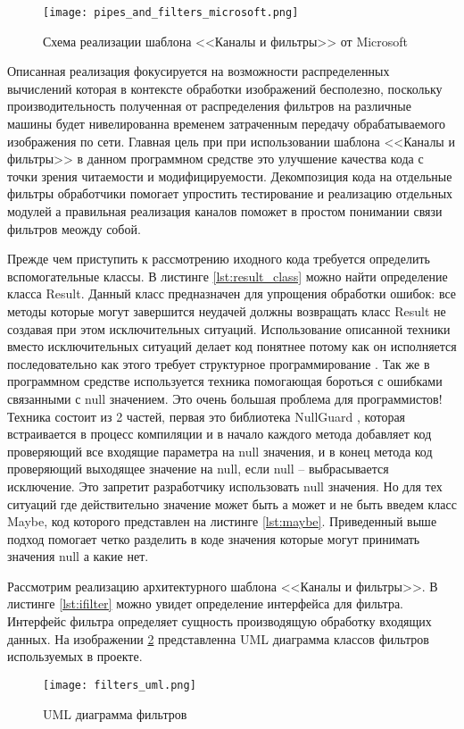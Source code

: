 \begin{figure}[ht] 
    \centering
    \texttt{[image: pipes\_and\_filters\_microsoft.png]}  
    \caption{Схема реализации шаблона <<Каналы и фильтры>> от Microsoft}
    \label{fig:creation:pipes_and_filters_microsoft}
\end{figure}

Описанная реализация фокусируется на возможности распределенных вычислений которая в контексте обработки изображений бесполезно, поскольку производительность полученная от распределения фильтров на различные машины будет нивелированна временем затраченным передачу обрабатываемого изображения по сети. Главная цель при при использовании шаблона <<Каналы и фильтры>> в данном программном средстве это улучшение качества кода с точки зрения читаемости и модифицируемости. Декомпозиция кода на отдельные фильтры обработчики помогает упростить тестирование и реализацию отдельных модулей а правильная реализация каналов поможет в простом понимании связи фильтров меожду собой.  

Прежде чем приступить к рассмотрению иходного кода требуется определить вспомогательные классы. 
В листинге \ref{lst:result_class} можно найти определение класса Result. Данный класс предназначен для упрощения обработки ошибок: все методы которые могут завершится неудачей должны возвращать класс Result не создавая при этом исключительных ситуаций. Использование описанной техники вместо исключительных ситуаций делает код понятнее потому как он исполняется последовательно как этого требует структурное программирование \cite{structured_programming}. Так же в программном средстве используется техника помогающая бороться с ошибками связанными с null значением. Это очень большая проблема для программистов! Техника состоит из 2 частей, первая это библиотека NullGuard \cite{null_guard}, которая встраивается в процесс компиляции и в начало каждого метода добавляет код проверяющий все входящие параметра на null значения, и в конец метода код проверяющий выходящее значение на null, если null -- выбрасывается исключение. Это запретит разработчику использовать null значения. Но для тех ситуаций где действительно значение может быть а может и не быть введем класс Maybe, код которого представлен на листинге \ref{lst:maybe}. Приведенный выше подход помогает четко разделить в коде значения которые могут принимать значения null а какие нет.

Рассмотрим реализацию архитектурного шаблона <<Каналы и фильтры>>. В листинге \ref{lst:ifilter} можно увидет определение интерфейса для фильтра. 
Интерфейс фильтра определяет сущность производящую обработку входящих данных. На изображении \ref{fig:creation:filters_uml} представленна UML диаграмма классов фильтров используемых в проекте.
\begin{figure}[ht] 
    \centering
    \texttt{[image: filters\_uml.png]}  
    \caption{UML диаграмма фильтров}
    \label{fig:creation:filters_uml}
\end{figure}

